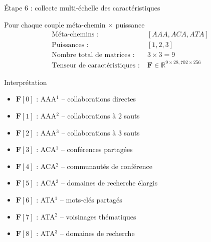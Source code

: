 \documentclass[9pt,aspectratio=169,professionalfonts]{beamer}
\begin{document}
\begin{frame}{Étape 6 : collecte multi-échelle des caractéristiques}
\begin{block}{Pour chaque couple méta-chemin × puissance}
\begin{align*}
\text{Méta-chemins :} &\; [AAA, ACA, ATA]\\
\text{Puissances :} &\; [1, 2, 3]\\
\text{Nombre total de matrices :} &\; 3\times3 = 9\\[4pt]
\text{Tenseur de caractéristiques :} &\; \mathbf F \in \mathbb R^{9\times28,702\times256}
\end{align*}
\end{block}

\begin{block}{Interprétation}
\begin{itemize}
    \item $\mathbf F[0]$ : AAA$^1$ – collaborations directes
    \item $\mathbf F[1]$ : AAA$^2$ – collaborations à 2 sauts
    \item $\mathbf F[2]$ : AAA$^3$ – collaborations à 3 sauts
    \item $\mathbf F[3]$ : ACA$^1$ – conférences partagées
    \item $\mathbf F[4]$ : ACA$^2$ – communautés de conférence
    \item $\mathbf F[5]$ : ACA$^3$ – domaines de recherche élargis
    \item $\mathbf F[6]$ : ATA$^1$ – mots-clés partagés
    \item $\mathbf F[7]$ : ATA$^2$ – voisinages thématiques
    \item $\mathbf F[8]$ : ATA$^3$ – domaines de recherche
\end{itemize}
\end{block}
\end{frame}
\end{document}
